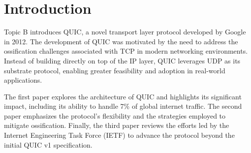 \section{Introduction}%
\label{sec:Introduction}
Topic B introduces QUIC, a novel transport layer protocol developed by Google in 2012. The development of QUIC was motivated by the need to address the ossification challenges associated with TCP in modern networking environments. Instead of building directly on top of the IP layer, QUIC leverages UDP as its substrate protocol, enabling greater feasibility and adoption in real-world applications.

The first paper \cite{langley2017quic} explores the architecture of QUIC and highlights its significant impact, including its ability to handle 7\% of global internet traffic. The second paper \cite{grinnemo2016towards} emphasizes the protocol's flexibility and the strategies employed to mitigate ossification. Finally, the third paper \cite{kosek2021beyond} reviews the efforts led by the Internet Engineering Task Force (IETF) to advance the protocol beyond the initial QUIC v1 specification.

